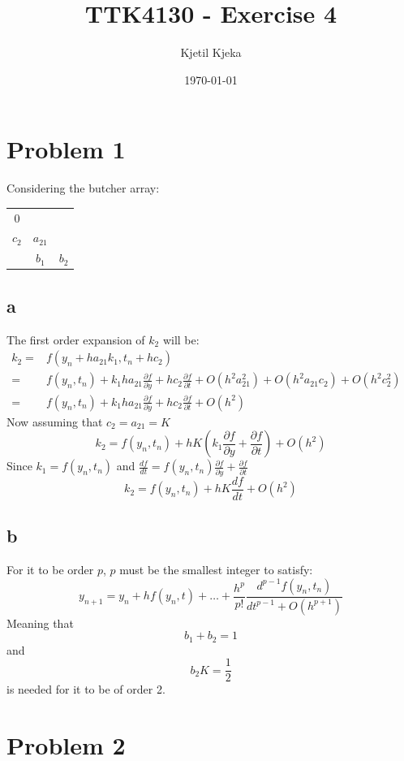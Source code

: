 \documentclass[11pt]{article}
\author{Kjetil Kjeka}
\title{TTK4130 - Exercise 4}
\date{\today}
\begin{document}
\maketitle
\section*{Problem 1}
Considering the butcher array: \\
\begin{tabular}{c|c c}
$0$ & & \\
$c_2$ & $a_{21}$ & \\ \hline
& $b_1$ & $b_2$
\end{tabular}
\subsection*{a}
The first order expansion of $k_2$ will be:
\begin{eqnarray*}
k_2 =& f(y_n + h a_{21} k_1, t_n + h c_2) &\\
=& f(y_n, t_n) + k_1 h a_{21} \frac{\partial f}{\partial y} + h c_2 \frac{\partial f}{\partial t} + O(h^2 a_{21}^2) + O(h^2 a_{21} c_2) + O(h^2 c_2^2) &\\
=& f(y_n, t_n) + k_1 h a_{21} \frac{\partial f}{\partial y} + h c_2 \frac{\partial f}{\partial t} + O(h^2) &
\end{eqnarray*}
Now assuming that $c_2 = a_{21} = K$ 
\[k_2 = f(y_n, t_n) + hK( k_1\frac{\partial f}{\partial y} + \frac{\partial f}{\partial t}) + O(h^2)\]
Since $k_1 = f(y_n, t_n)$ and $\frac{df}{dt} = f(y_n, t_n) \frac{\partial f}{\partial y} + \frac{\partial f}{\partial t}$
\[k_2 = f(y_n, t_n) + hK \frac{df}{dt} + O(h^2) \]


\subsection*{b}
For it to be order $p$, $p$ must be the smallest integer to satisfy:
\[ y_{n+1} = y_n + h f(y_n, t) + \dots + \frac{h^p}{p!} \frac{d^{p-1} f(y_n, t_n)}{dt^{p-1} + O(h^{p+1})} \]
Meaning that 
\[b_1 + b_2 = 1\] 
and 
\[b_2K = \frac{1}{2}\]
is needed for it to be of order 2.

\section*{Problem 2}
\end{document}
